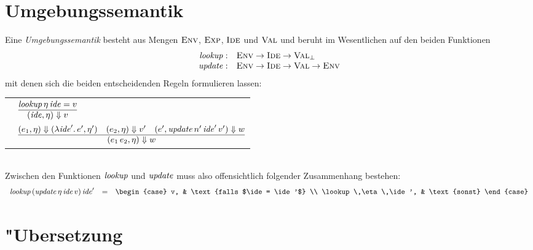 \documentclass[12pt,a4paper]{article}
\begin{document}
\section{Umgebungssemantik}

Eine \emph{Umgebungssemantik} besteht aus Mengen $\textsc{Env}$, $\textsc{Exp}$, $\textsc{Ide}$ und $\textsc{Val}$ und beruht im
Wesentlichen auf den beiden Funktionen
\[\begin{array}{rl}
  \mathit{lookup}: & \textsc{Env} \to \textsc{Ide} \to \textsc{Val}_\bot \\
  \mathit{update}: & \textsc{Env} \to \textsc{Ide} \to \textsc{Val} \to \textsc{Env} 
\end{array}\]
mit denen sich die beiden entscheidenden Regeln formulieren lassen: \\[3mm]
\begin{tabular}{rl}
  \RN{Lookup} & $\RULE{\lookup\,\eta\,\ide = v}{(\ide,\eta) \Downarrow v}$ \\[3mm]
  \RN{Beta-V} & $\RULE{(e_1,\eta) \Downarrow (\abstr{\ide'}{e'},\eta') \quad (e_2,\eta) \Downarrow v' \quad (e',\update\,n'\,\ide'\,v') \Downarrow w}{(\app{e_1}{e_2},\eta) \Downarrow w}$ \\[3mm]
\end{tabular} \\[3mm]
Zwischen den Funktionen $\mathit{lookup}$ und $\mathit{update}$ muss also offensichtlich folgender
Zusammenhang bestehen:
\[\begin{array}{rcl}
  \lookup\,(\update\,\eta\,\ide\,v)\,\ide'
  &=&
  \begin{case}
    v, & \text{falls $\ide = \ide'$} \\
    \lookup\,\eta\,\ide', & \text{sonst}
  \end{case}
\end{array}\]


\section{"Ubersetzung}
\end{document}

